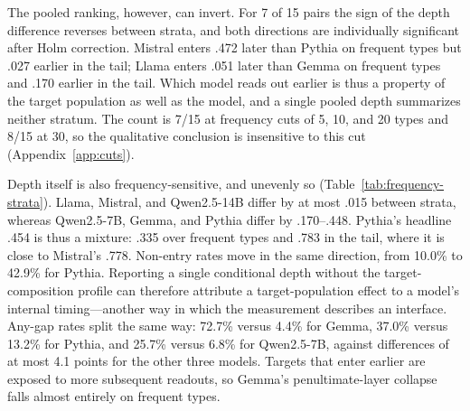 \documentclass[11pt]{article}
\begin{document}
The pooled ranking, however, can invert. For 7 of 15 pairs the sign of the depth difference reverses between strata, and both directions are individually significant after Holm correction. Mistral enters .472 later than Pythia on frequent types but .027 earlier in the tail; Llama enters .051 later than Gemma on frequent types and .170 earlier in the tail. Which model reads out earlier is thus a property of the target population as well as the model, and a single pooled depth summarizes neither stratum. The count is 7/15 at frequency cuts of 5, 10, and 20 types and 8/15 at 30, so the qualitative conclusion is insensitive to this cut (Appendix~\ref{app:cuts}).

\begin{table}[t]
\centering\small
{}
\caption{First-entry depth $F$ and non-entry rate $N$ (percent) for targets whose lexical first token is among a model's ten most frequent types (521--522 items) versus the tail (295--296 items). $\Delta$ is the depth difference. Readout depth is frequency-sensitive for three models and nearly flat for three others.}
\label{tab:frequency-strata}
\end{table}

Depth itself is also frequency-sensitive, and unevenly so (Table~\ref{tab:frequency-strata}). Llama, Mistral, and Qwen2.5-14B differ by at most .015 between strata, whereas Qwen2.5-7B, Gemma, and Pythia differ by .170--.448. Pythia's headline .454 is thus a mixture: .335 over frequent types and .783 in the tail, where it is close to Mistral's .778. Non-entry rates move in the same direction, from 10.0\% to 42.9\% for Pythia. Reporting a single conditional depth without the target-composition profile can therefore attribute a target-population effect to a model's internal timing---another way in which the measurement describes an interface. Any-gap rates split the same way: 72.7\% versus 4.4\% for Gemma, 37.0\% versus 13.2\% for Pythia, and 25.7\% versus 6.8\% for Qwen2.5-7B, against differences of at most 4.1 points for the other three models. Targets that enter earlier are exposed to more subsequent readouts, so Gemma's penultimate-layer collapse falls almost entirely on frequent types.
\end{document}
